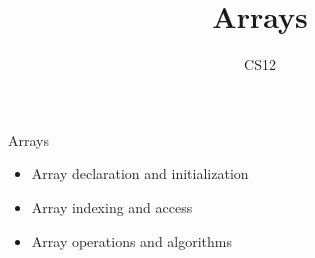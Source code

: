 \documentclass{beamer}
\title{Arrays}
\author{CS12}
\date{}
\begin{document}
\begin{frame}
    \titlepage
\end{frame}

\begin{frame}{Arrays}
    \begin{itemize}
        \item Array declaration and initialization
        \item Array indexing and access
        \item Array operations and algorithms
    \end{itemize}
\end{frame}
\end{document}

